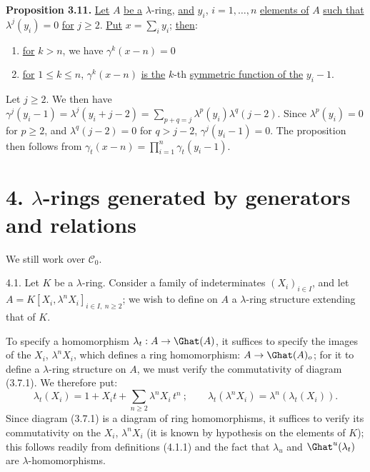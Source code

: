 %
\textbf{Proposition 3.11.} \uline{Let} \(A\) \uline{be a} \(\lambda\)-ring, \uline{and} \(y_i\), \(i=1,\dots,n\) \uline{elements of} \(A\) \uline{such that} \(\lambda^j(y_i)=0\) \uline{for} \(j\ge2\). \uline{Put} \(x=\sum_i y_i\); \uline{then}:
\begin{enumerate}[label=\roman*)]
\item \uline{for} \(k>n\), we have \(\gamma^k(x-n)=0\)
\item \uline{for} \(1\le k\le n\), \(\gamma^k(x-n)\) \uline{is the} \(k\)-th \uline{symmetric function of the} \(y_i-1\).
\end{enumerate}
Let \(j\ge2\). We then have \(\gamma^j(y_i-1)=\lambda^j(y_i+j-2)=\sum_{p+q=j}\lambda^p(y_i)\lambda^q(j-2)\). Since \(\lambda^p(y_i)=0\) for \(p\ge2\), and \(\lambda^q(j-2)=0\) for \(q>j-2\), \(\gamma^j(y_i-1)=0\). The proposition then follows from \(\gamma_t(x-n)=\prod_{i=1}^{n}\gamma_t(y_i-1)\).

\section*{4. \(\lambda\)-rings generated by generators and relations}

We still work over \(\mathcal C_0\).

4.1. Let \(K\) be a \(\lambda\)-ring. Consider a family of indeterminates \((X_i)_{i\in I}\), and let \(A=K[X_i,\lambda^n X_i]_{i\in I,\ n\ge2}\); we wish to define on \(A\) a \(\lambda\)-ring structure extending that of \(K\).

To specify a homomorphism \(\lambda_t:A\to\Ghat(A)\), it suffices to specify the images of the \(X_i\), \(\lambda^n X_i\), which defines a ring homomorphism: \(A\to\Ghat(A)_o\); for it to define a \(\lambda\)-ring structure on \(A\), we must verify the commutativity of diagram (3.7.1). We therefore put:
\begin{equation}\tag{4.1.1}
  \lambda_t(X_i)=1+X_it+\sum_{n\ge2}\lambda^n X_i\,t^n~;
  \qquad
  \lambda_t(\lambda^n X_i)=\lambda^n(\lambda_t(X_i)).
\end{equation}
Since diagram (3.7.1) is a diagram of ring homomorphisms, it suffices to verify its commutativity on the \(X_i\), \(\lambda^n X_i\) (it is known by hypothesis on the elements of \(K\)); this follows readily from definitions (4.1.1) and the fact that \(\lambda_u\) and \(\Ghat^u(\lambda_t)\) are \(\lambda\)-homomorphisms.

